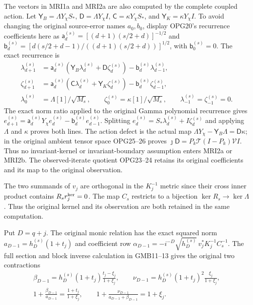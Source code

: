 \documentclass[11pt,a4paper]{article}
\begin{document}
The vectors in MRI1a and MRI2a are also computed by the complete
coupled action. Let $\mathsf Y_B=\Lambda Y_\chi S_*$,
$\mathsf D=\Lambda Y_\chi I$, $\mathsf C=\kappa Y_\chi S_*$,
and $\mathsf Y_K=\kappa Y_\chi I$. To avoid changing the
original source-error names $a_0,b_0$, display OPG20's recurrence
coefficients here as
$\mathsf a_d^{(s)}=[(d+1)(s/2+d)]^{-1/2}$ and
$\mathsf b_d^{(s)}=[d(s/2+d-1)/((d+1)(s/2+d))]^{1/2}$,
with $\mathsf b_0^{(s)}=0$. The exact recurrence is
\[
\begin{split}
 \lambda_{d+1}^{(s)}
 &=\mathsf a_d^{(s)}(\mathsf Y_B\lambda_d^{(s)}
                         +\mathsf D\zeta_d^{(s)})
                           -\mathsf b_d^{(s)}\lambda_{d-1}^{(s)},\\
 \zeta_{d+1}^{(s)}
 &=\mathsf a_d^{(s)}(\mathsf C\lambda_d^{(s)}
                         +\mathsf Y_K\zeta_d^{(s)})
                           -\mathsf b_d^{(s)}\zeta_{d-1}^{(s)},\\
 \lambda_0^{(s)}&=\Lambda[1]/\sqrt{M_s},\qquad
 \zeta_0^{(s)}=\kappa[1]/\sqrt{M_s},\qquad
 \lambda_{-1}^{(s)}=\zeta_{-1}^{(s)}=0.
\end{split}\tag{MRI2b}
\]
The exact norm ratio applied to the original Gamma polynomial
recurrence gives
$e_{d+1}^{(s)}=\mathsf a_d^{(s)}Y_\chi e_d^{(s)}
-\mathsf b_d^{(s)}e_{d-1}^{(s)}$. Splitting
$e_d^{(s)}=S_*\lambda_d^{(s)}+I\zeta_d^{(s)}$ and applying
$\Lambda$ and $\kappa$ proves both lines. The action defect is
the actual map
$\Lambda Y_\chi-\mathsf Y_B\Lambda=\mathsf D\kappa$;
in the original ambient tensor space OPG25--26 proves
$\jmath\mathsf D=P_k\mathcal T(I-P_k)\mathcal V I$.
Thus no invariant-kernel or invariant-boundary assumption enters
MRI2a or MRI2b. The observed-iterate quotient OPG23--24 retains
its original coefficients and its map to the original observation.

The two summands of $v_j$ are orthogonal in the $K_j^{-1}$
metric since their cross inner product contains $R_sr_j^{\rm ker}=0$.
The map $C_s$ restricts to a bijection
$\ker R_s\to\ker\Lambda$. Thus the original kernel and its
observation are both retained in the same computation.

Put $D=q+j$. The original monic relation has the exact squared
norm $a_{D-1}=h_D^{(s)}(1+t_j)$ and coefficient row
$\alpha_{D-1}=-i^{-D}\sqrt{h_D^{(s)}}\,
v_j^*K_j^{-1}C_s^{-1}$. The full section and block inverse
calculation in GMB11--13 gives the original two contractions
\[
\begin{gathered}
 \beta_{D-1}=h_D^{(s)}(1+t_j)\frac{t_j-\xi_j}{1+\xi_j},
 \qquad
 \nu_{D-1}=h_D^{(s)}(1+t_j)^2\frac{\xi_j}{1+\xi_j},\\
 1+\frac{\beta_{D-1}}{a_{D-1}}
          =\frac{1+t_j}{1+\xi_j},\qquad
 1+\frac{\nu_{D-1}}{a_{D-1}+\beta_{D-1}}=1+\xi_j.
\end{gathered}\tag{MRI3}
\]
\end{document}
